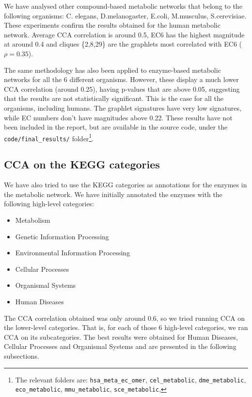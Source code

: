 We have analysed other compound-based metabolic networks that belong to the following organisms: C. elegans, D.melanogaster, E.coli, M.musculus, S.cerevisiae. These experiments confirm the results obtained for the human metabolic network. Average CCA correlation is around 0.5, EC6 has the highest magnitude at around 0.4 and cliques \{2,8,29\} are the graphlets most correlated with EC6 ($\rho = 0.35$).

The same methodology has also been applied to enzyme-based metabolic networks for all the 6 different organisms. However, these display a much lower CCA correlation (around 0.25), having p-values that are above 0.05, suggesting that the results are not statistically significant. This is the case for all the organisms, including humans. The graphlet signatures have very low signatures, while EC numbers don't have magnitudes above 0.22. These results have not been included in the report, but are available in the source code, under the \lstinline|code/final_results/| folder\footnote{The relevant folders are: \lstinline|hsa_meta_ec_omer|, \lstinline|cel_metabolic|, \lstinline|dme_metabolic|, \lstinline|eco_metabolic|, \lstinline|mmu_metabolic|, \lstinline|sce_metabolic|, }.

\subsection{CCA on the KEGG categories}

We have also tried to use the KEGG categories as annotations for the enzymes in the metabolic network. We have initially annotated the enzymes with the following high-level categories:
\begin{itemize}
 \item Metabolism
 \item Genetic Information Processing
 \item Environmental Information Processing
 \item Cellular Processes
 \item Organismal Systems
 \item Human Diseases
\end{itemize}

The CCA correlation obtained was only around 0.6, so we tried running CCA on the lower-level categories. That is, for each of those 6 high-level categories, we ran CCA on its subcategories. The best results were obtained for Human Diseases, Cellular Processes and Organismal Systems and are presented in the following subsections.

